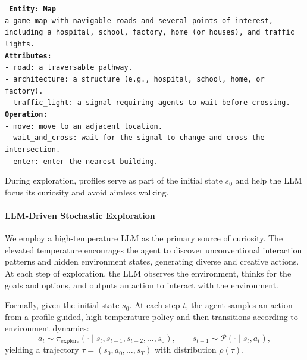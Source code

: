 \begin{center}
\begin{tcolorbox}[
  title=An example of \textit{Environment Profile},
  width=16cm,
  boxrule=0.45mm,
  fonttitle=\bfseries,
  enhanced,
  sharp corners,
  colback=white,
  colframe=black!70,
  arc=0mm,
  pad at break=2mm,
  outer arc=0mm
]
\texttt{%
\textbf{Entity: Map} \\
a game map with navigable roads and several points of interest, including a hospital, school, factory, home (or houses), and traffic lights.
\\
\textbf{Attributes:} \\
- road: a traversable pathway. \\
- architecture: a structure (e.g., hospital, school, home, or factory). \\
- traffic\_light: a signal requiring agents to wait before crossing. \\
\textbf{Operation:} \\
- move: move to an adjacent location.  \\
- wait\_and\_cross: wait for the signal to change and cross the intersection. \\
- enter: enter the nearest building.
}
\end{tcolorbox}
 \label{fig:environment-profile}
\end{center}

During exploration, profiles serve as part of the initial state $s_0$ and help the LLM focus its curiosity and avoid aimless walking.

\paragraph{LLM-Driven Stochastic Exploration} We employ a high-temperature LLM as the primary source of curiosity. The elevated temperature encourages the agent to discover unconventional interaction patterns and hidden environment states, generating diverse and creative actions. At each step of exploration, the LLM observes the environment, thinks for the goals and options, and outputs an action to interact with the environment.

Formally, given the initial state $s_0$. At each step $t$, the agent samples an action from a profile-guided, high-temperature policy and then transitions according to environment dynamics:
\begin{equation}
a_t \sim \pi_\mathrm{explore}(\cdot\mid s_t,s_{t-1},s_{t-2},\dots,s_{0}),\qquad 
s_{t+1}\sim \mathcal{P}(\cdot\mid s_t,a_t),
\end{equation}
yielding a trajectory $\tau=(s_0,a_0,\ldots,s_T)$ with distribution $\rho(\tau)$.



